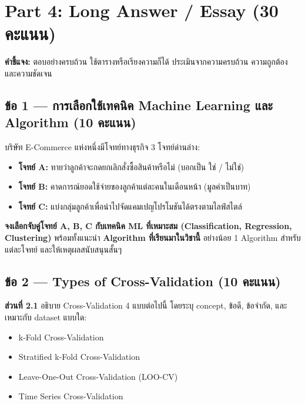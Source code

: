 \documentclass[a4paper,12pt]{article}
\begin{document}
\newpage

\section*{Part 4: Long Answer / Essay (30 คะแนน)}
\textbf{คำชี้แจง:} ตอบอย่างครบถ้วน ใช้ตารางหรือเรียงความก็ได้ ประเมินจากความครบถ้วน ความถูกต้อง และความชัดเจน

\subsection*{ข้อ 1 — การเลือกใช้เทคนิค Machine Learning และ Algorithm (10 คะแนน)}

บริษัท E-Commerce แห่งหนึ่งมีโจทย์ทางธุรกิจ 3 โจทย์ด่านล่าง:
\begin{itemize}
    \item \textbf{โจทย์ A:} ทายว่าลูกค้าจะกดยกเลิกสั่งซื้อสินค้าหรือไม่ (บอกเป็น ใช่ / ไม่ใช่)
    \item \textbf{โจทย์ B:} คาดการณ์ยอดใช้จ่ายของลูกค้าแต่ละคนในเดือนหน้า (มูลค่าเป็นบาท)
    \item \textbf{โจทย์ C:} แบ่งกลุ่มลูกค้าเพื่อนำไปจัดแคมเปญโปรโมชันได้ตรงตามไลฟ์สไตล์
\end{itemize}

\textbf{จงเลือกจับคู่โจทย์ A, B, C กับเทคนิค ML ที่เหมาะสม (Classification, Regression, Clustering)} 
พร้อมทั้งแนะนำ \textbf{Algorithm ที่เรียนมาในวิชานี้} อย่างน้อย 1 Algorithm สำหรับแต่ละโจทย์ และให้เหตุผลสนับสนุนสั้นๆ

\vspace{9.5cm}

\newpage

\subsection*{ข้อ 2 — Types of Cross-Validation (10 คะแนน)}

\textbf{ส่วนที่ 2.1} อธิบาย Cross-Validation 4 แบบต่อไปนี้ โดยระบุ concept, ข้อดี, ข้อจำกัด, และเหมาะกับ dataset แบบใด:
\begin{itemize}
    \item k-Fold Cross-Validation
    \item Stratified k-Fold Cross-Validation
    \item Leave-One-Out Cross-Validation (LOO-CV)
    \item Time Series Cross-Validation
\end{itemize}
\end{document}
